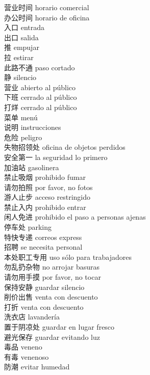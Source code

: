 营业时间 \quad horario comercial\\
办公时间 \quad horario de oficina\\
入口 \quad entrada\\
出口 \quad salida\\
推 \quad empujar\\
拉 \quad estirar\\
此路不通 \quad paso cortado\\
静 \quad silencio\\
营业 \quad abierto al público\\
下班 \quad cerrado al público\\
打烊 \quad cerrado al público\\
菜单 \quad menú\\
说明 \quad instrucciones\\
危险 \quad peligro\\
失物招领处 \quad oficina de objetos perdidos\\
安全第一 \quad la seguridad lo primero\\
加油站 \quad gasolinera\\
禁止吸烟 \quad prohibido fumar\\
请勿拍照 \quad por favor, no fotos\\
游人止步 \quad acceso restringido\\
禁止入内 \quad prohibido entrar\\
闲人免进 \quad prohibido el paso a personas ajenas\\
停车处 \quad parking\\
特快专递 \quad correos express\\
招聘 \quad se necesita personal\\
本处职工专用 \quad uso sólo para trabajadores\\
勿乱扔杂物 \quad no arrojar basuras\\
请勿用手摸 \quad por favor, no tocar\\
保持安静 \quad guardar silencio\\
削价出售 \quad venta con descuento\\
打折 \quad venta con descuento\\
洗衣店 \quad lavandería\\
置于阴凉处 \quad guardar en lugar fresco\\
避光保存 \quad guardar evitando luz\\
毒品 \quad veneno\\
有毒 \quad venenoso\\
防潮 \quad evitar humedad\\
